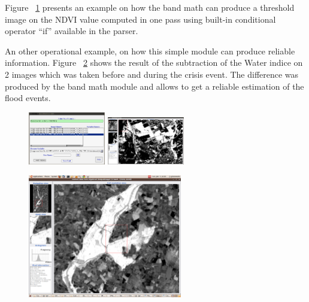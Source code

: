 Figure ~\ref{fig:bandmathndviwithres} presents an example on how the band math
can produce a threshold image on the NDVI value computed in one pass
using built-in conditional operator ``if'' available in the parser.

An other operational example, on how this simple module can produce
reliable information.  Figure ~\ref{fig:ndwi2} shows the result of the
subtraction of the Water indice on 2 images which was taken before and
during the crisis event.  The difference was produced by the band math
module and allows to get a reliable estimation of the flood events.


\begin{figure}[!h]
  \center
  \includegraphics[width=0.3\textwidth]{../Art/MonteverdiImages/monteverdi_band_math_ndvi_threshold.png}
  \includegraphics[width=0.3\textwidth]{../Art/MonteverdiImages/monteverdi_band_math_result.png}
  \label{fig:bandmathndviwithres}
\end{figure}

\begin{figure}
  \center
  \includegraphics[width=0.6\textwidth]{../Art/MonteverdiImages/monteverdi_NDWI2_substraction.png}
  \label{fig:ndwi2}
\end{figure}


